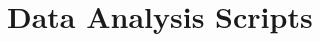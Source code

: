 \documentclass[11pt, a4paper]{article}\usepackage[]{graphicx}\usepackage[]{color}
\begin{document}
\section{Data Analysis Scripts} \label{sec:rscripts}
%
%
%
%
%
%
%
%
%
%
%
%
%
%
%
%
%
%
%
%
%
%
%
%
%
%
%
%
%
\end{document}
